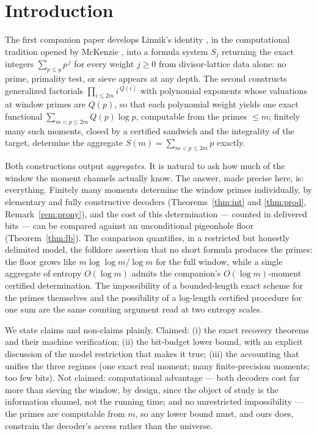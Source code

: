 \documentclass[11pt]{article}
\theoremstyle{remark}
\begin{document}
\section{Introduction}

The first companion paper \cite{CompanionI} develops Linnik's identity \cite{Linnik}, in the
computational tradition opened by McKenzie \cite{McKenzie}, into a formula system $S_j$ returning the
exact integers $\sum_{p \le y} p^{\,j}$ for every weight $j \ge 0$ from divisor-lattice data alone: no
prime, primality test, or sieve appears at any depth. The second \cite{CompanionII} constructs
generalized factorials $\prod_{i \le 2m} i^{\,Q(i)}$ with polynomial exponents whose valuations at
window primes are $Q(p)$, so that each polynomial weight yields one exact functional
$\sum_{m < p \le 2m} Q(p) \log p$, computable from the primes $\le m$; finitely many such moments,
closed by a certified sandwich and the integrality of the target, determine the aggregate
$S(m) = \sum_{m < p \le 2m} p$ exactly.

Both constructions output \emph{aggregates}. It is natural to ask how much of the window the moment
channels actually know. The answer, made precise here, is: everything. Finitely many moments determine
the window primes individually, by elementary and fully constructive decoders (Theorems~\ref{thm:int}
and \ref{thm:prod}, Remark~\ref{rem:prony}), and the cost of this determination --- counted in
delivered bits --- can be compared against an unconditional pigeonhole floor
(Theorem~\ref{thm:lb}). The comparison quantifies, in a restricted but honestly delimited model, the
folklore assertion that no short formula produces the primes: the floor grows like
$m \log\log m / \log m$ for the full window, while a single aggregate of entropy $O(\log m)$ admits the
companion's $O(\log m)$-moment certified determination. The impossibility of a bounded-length exact
scheme for the primes themselves and the possibility of a log-length certified procedure for one sum
are the same counting argument read at two entropy scales.

We state claims and non-claims plainly. Claimed: (i) the exact recovery theorems and their machine
verification; (ii) the bit-budget lower bound, with an explicit discussion of the model restriction
that makes it true; (iii) the accounting that unifies the three regimes (one exact real moment; many
finite-precision moments; too few bits). Not claimed: computational advantage --- both decoders cost
far more than sieving the window, by design, since the object of study is the information channel, not
the running time; and no unrestricted impossibility --- the primes are computable from $m$, so any
lower bound must, and ours does, constrain the decoder's access rather than the universe.
\end{document}
